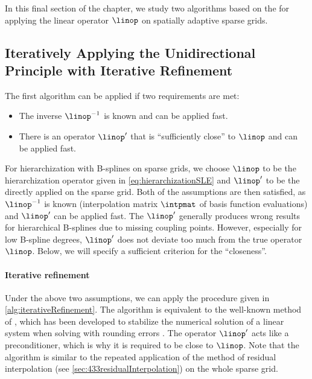 \label{sec:45spatAdaptiveUP}

In this final section of the chapter,
we study two algorithms based on the \up
for applying the linear operator $\linop$ on spatially adaptive sparse grids.



\subsection{%
  Iteratively Applying the Unidirectional Principle with Iterative Refinement%
}
\label{sec:451iterativeRefinement}

The first algorithm can be applied if two requirements are met:
\begin{itemize}
  \item
  The inverse $\linop^{-1}$ is known and can be applied fast.
  
  \item
  There is an operator $\linop'$
  that is ``sufficiently close'' to $\linop$ and can be applied fast.
\end{itemize}
For hierarchization with B-splines on sparse grids,
we choose $\linop$ to be the hierarchization
operator given in \cref{eq:hierarchizationSLE} and
$\linop'$ to be the \up directly applied on the
sparse grid.
Both of the assumptions are then satisfied,
as $\linop^{-1}$ is known
(interpolation matrix $\intpmat$ of basis function evaluations)
and $\linop'$ can be applied fast.
The \up $\linop'$ generally produces wrong
results for hierarchical B-splines due to missing coupling points.
However, especially for low B-spline degrees,
$\linop'$ does not deviate too much from the true operator $\linop$.
Below, we will specify a sufficient criterion for the ``closeness''.

\paragraph{Iterative refinement}

Under the above two assumptions, we can apply the procedure given in
\cref{alg:iterativeRefinement}.
The algorithm is equivalent to the well-known method of
, which has been developed to
stabilize the numerical solution of a linear system when solving
with rounding errors \cite{Higham02Accuracy}.
The operator $\linop'$ acts like a preconditioner,
which is why it is required to be close to $\linop$.
Note that the algorithm is similar to the repeated application
of the method of residual interpolation
(see \cref{sec:433residualInterpolation}) on the whole sparse grid.

